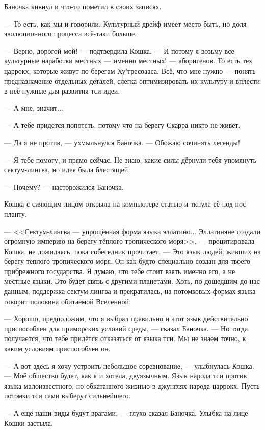 Баночка кивнул и что-то пометил в своих записях.

--- То есть, как мы и говорили.
Культурный дрейф имеет место быть, но доля эволюционного процесса всё-таки больше.

--- Верно, дорогой мой! --- подтвердила Кошка.
--- И потому я возьму все культурные наработки местных --- именно местных! --- аборигенов.
То есть тех царрокх, которые живут по берегам Ху'тресоааса.
Всё, что мне нужно --- понять предназначение отдельных деталей, слегка оптимизировать их культуру и вплести в неё нужные для развития тси идеи.

--- А мне, значит...

--- А тебе придётся попотеть, потому что на берегу Скарра никто не живёт.

--- Да я не против, --- ухмыльнулся Баночка.
--- Обожаю сочинять легенды!

--- Я тебе помогу, и прямо сейчас.
Не знаю, какие силы дёрнули тебя упомянуть сектум-лингва, но идея была блестящей.

--- Почему? --- насторожился Баночка.

Кошка с сияющим лицом открыла на компьютере статью и ткнула её под нос планту.

--- <<Сектум-лингва --- упрощённая форма языка эллатино...
Эллатиняне создали огромную империю на берегу тёплого тропического моря>>, --- процитировала Кошка, не дожидаясь, пока собеседник прочитает.
--- Это язык людей, живших на берегу тёплого тропического моря.
Он как будто специально создан для твоего прибрежного государства.
Я думаю, что тебе стоит взять именно его, а не местные языки.
Это будет связь с другими планетами.
Хоть, по дошедшим до нас данным, поддержка сектум-лингва и прекратилась, на потомковых формах языка говорит половина обитаемой Вселенной.

--- Хорошо, предположим, что я выбрал правильно и этот язык действительно приспособлен для приморских условий среды, --- сказал Баночка.
--- Но тогда получается, что тебе придётся отказаться от языка тси.
Мы не знаем точно, к каким условиям приспособлен он.

--- А вот здесь я хочу устроить небольшое соревнование, --- улыбнулась Кошка.
--- Моё общество будет, как я и хотела, двуязычным.
Язык народа тси против языка малоизвестного, но обкатанного жизнью в джунглях народа царрокх.
Пусть потомки тси сами выберут сильнейшего.

--- А ещё наши виды будут врагами, --- глухо сказал Баночка.
Улыбка на лице Кошки застыла.

